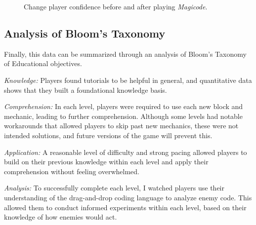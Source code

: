 \documentclass[10pt,twocolumn]{article}
\begin{document}
\begin{figure}
    \centering
    \caption{Change player confidence before and after playing \textit{Magicode}.}
    \label{confidence-graph}
\end{figure}


\subsection{Analysis of Bloom's Taxonomy}
Finally, this data can be summarized through an analysis of Bloom’s Taxonomy of Educational objectives.

\textit{Knowledge:} Players found tutorials to be helpful in general, and quantitative data shows that they built a foundational knowledge basis.

\textit{Comprehension:} In each level, players were required to use each new block and mechanic, leading to further comprehension. Although some levels had notable workarounds that allowed players to skip past new mechanics, these were not intended solutions, and future versions of the game will prevent this.

\textit{Application:} A reasonable level of difficulty and strong pacing allowed players to build on their previous knowledge within each level and apply their comprehension without feeling overwhelmed.

\textit{Analysis:} To successfully complete each level, I watched players use their understanding of the drag-and-drop coding language to analyze enemy code. This allowed them to conduct informed experiments within each level, based on their knowledge of how enemies would act.
\end{document}
